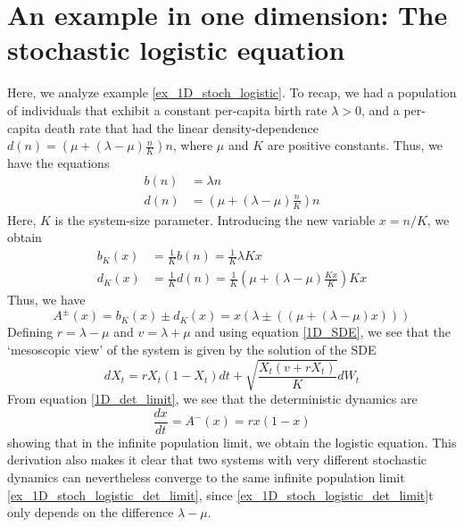 \section{An example in one dimension: The stochastic logistic equation}
Here, we analyze example \ref{ex_1D_stoch_logistic}. To recap, we had a population of individuals that exhibit a constant per-capita birth rate $\lambda > 0$, and a per-capita death rate that had the linear density-dependence $d(n) = \left(\mu + (\lambda-\mu)\frac{n}{K}\right)n$, where $\mu$ and $K$ are positive constants. Thus, we have the equations
\begin{equation}
\label{ex_1D_stoch_logistic_BD_eqns}
\begin{aligned}
    b(n) &= \lambda n\\
    d(n) &= \left(\mu + (\lambda-\mu)\frac{n}{K}\right)n
\end{aligned}
\end{equation}
Here, $K$ is the system-size parameter. Introducing the new variable $x=n/K$, we obtain
\begin{align*}
    b_K(x) &= \frac{1}{K}b(n) = \frac{1}{K}\lambda Kx\\
    d_K(x) &= \frac{1}{K}d(n) = \frac{1}{K}\left(\mu + (\lambda-\mu)\frac{Kx}{K}\right)Kx
\end{align*}
Thus, we have
\begin{equation*}
    A^{\pm}(x) = b_K(x)\pm d_K(x) = x\left(\lambda \pm \left(\left(\mu + (\lambda-\mu)x\right)\right) \right)
\end{equation*}
Defining $r=\lambda-\mu$ and $v=\lambda+\mu$ and using equation \eqref{1D_SDE}, we 
see that the `mesoscopic view' of the system is given by the solution of the SDE
\begin{equation}\label{ex_1D_stoch_logistic_full_SDE}
dX_t =  rX_t(1-X_t)dt + \sqrt{\frac{X_t(v+rX_t)}{K}}dW_t
\end{equation}
From equation \eqref{1D_det_limit}, we see that the deterministic dynamics are
\begin{equation}\label{ex_1D_stoch_logistic_det_limit}
\frac{dx}{dt} = A^-(x) = rx(1-x)
\end{equation}
showing that in the infinite population limit, we obtain the logistic equation. This derivation also makes it clear that two systems with very different stochastic dynamics can nevertheless converge to the same infinite population limit \eqref{ex_1D_stoch_logistic_det_limit}, since \eqref{ex_1D_stoch_logistic_det_limit}t only depends on the difference $\lambda-\mu$.
